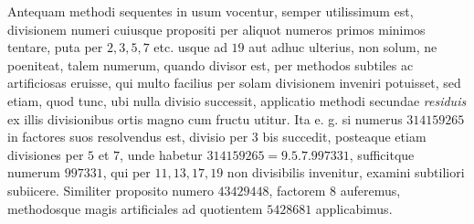 Antequam methodi sequentes in usum vocentur, semper utilissimum est, divisionem numeri cuiusque propositi per aliquot numeros primos minimos tentare, puta per \(2,\allowbreak 3,\allowbreak 5,\allowbreak 7\) etc. usque ad \(19\) aut adhuc ulterius, non solum, ne poeniteat, talem numerum, quando divisor est, per methodos subtiles ac artificiosas eruisse, qui multo facilius per solam divisionem inveniri potuisset, sed etiam, quod tunc, ubi nulla divisio successit, applicatio methodi secundae \textit{residuis} ex illis divisionibus ortis magno cum fructu utitur. Ita e. g. si numerus \(314159265\) in factores suos resolvendus est, divisio per \(3\) bis succedit, posteaque etiam divisiones per \(5\) et \(7\), unde habetur \(314159265=9.5.7.997331\), sufficitque numerum \(997331\), qui per \(11,\allowbreak 13,\allowbreak 17,\allowbreak 19\) non divisibilis invenitur, examini subtiliori subiicere. Similiter proposito numero \(43429448\), factorem \(8\) auferemus, methodosque magis artificiales ad quotientem \(5428681\) applicabimus.

